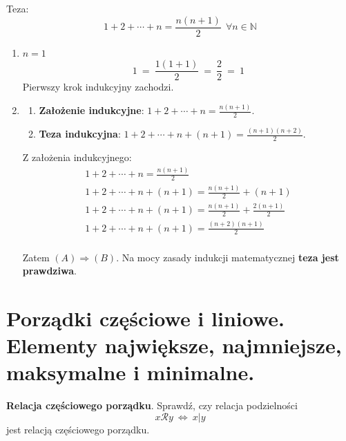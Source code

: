 \documentclass[12pt]{article}
\begin{document}
    \begin{exercise}
        Teza:
        \[1 + 2 + \cdots + n = \frac{n(n+1)}{2} ~~ \forall n \in \mathbb{N}\]
    \end{exercise}

    \begin{enumerate}
        \item $n = 1$
        \[1 ~ = ~ \frac{1(1+1)}{2} ~ = ~ \frac{2}{2} ~ = ~ 1\]
        Pierwszy krok indukcyjny zachodzi.

        \item
        \begin{enumerate}[label=(\Alph*)]
            \item \textbf{Założenie indukcyjne}: $1 + 2 + \cdots + n = \frac{n(n+1)}{2}$.
            \item \textbf{Teza indukcyjna}: $1 + 2 + \cdots + n + (n+1) = \frac{(n+1)(n+2)}{2}$.
        \end{enumerate}

        Z założenia indukcyjnego:
        \begin{gather*}
            1 + 2 + \cdots + n = \frac{n(n+1)}{2}\\
            1 + 2 + \cdots + n + (n+1) = \frac{n(n+1)}{2} + (n+1)\\
            1 + 2 + \cdots + n + (n+1) = \frac{n(n+1)}{2} + \frac{2(n+1)}{2}\\
            1 + 2 + \cdots + n + (n+1) = \frac{(n+2)(n+1)}{2}\\
        \end{gather*}

        Zatem $(A) \Rightarrow (B)$. Na mocy zasady indukcji matematycznej \textbf{teza jest prawdziwa}.

    \end{enumerate}

    \newpage

    \section{Porządki częściowe i liniowe. Elementy największe, najmniejsze, maksymalne i minimalne.}

    \begin{exercise}
        \textbf{Relacja częściowego porządku}. Sprawdź, czy relacja podzielności
        \[ x \mathcal{R} y ~ \Leftrightarrow ~ x | y \]
        jest relacją częściowego porządku.
    \end{exercise}
\end{document}
